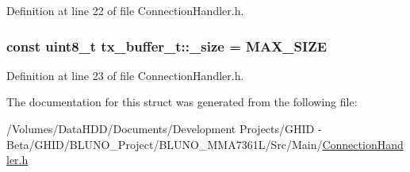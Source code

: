 \-Definition at line 22 of file \-Connection\-Handler.\-h.

\hypertarget{structtx__buffer__t_a9e50e47b9d21ef81014e8325acc2bb3f}{
\subsubsection[{\-\_\-size}]{\setlength{\rightskip}{0pt plus 5cm}const uint8\-\_\-t {\bf tx\-\_\-buffer\-\_\-t\-::\-\_\-size} = {\bf \-M\-A\-X\-\_\-\-S\-I\-Z\-E}}}\label{structtx__buffer__t_a9e50e47b9d21ef81014e8325acc2bb3f}


\-Definition at line 23 of file \-Connection\-Handler.\-h.



\-The documentation for this struct was generated from the following file\-:\begin{DoxyCompactItemize}
\item 
/\-Volumes/\-Data\-H\-D\-D/\-Documents/\-Development Projects/\-G\-H\-I\-D -\/ Beta/\-G\-H\-I\-D/\-B\-L\-U\-N\-O\-\_\-\-Project/\-B\-L\-U\-N\-O\-\_\-\-M\-M\-A7361\-L/\-Src/\-Main/\hyperlink{_connection_handler_8h}{\-Connection\-Handler.\-h}\end{DoxyCompactItemize}
